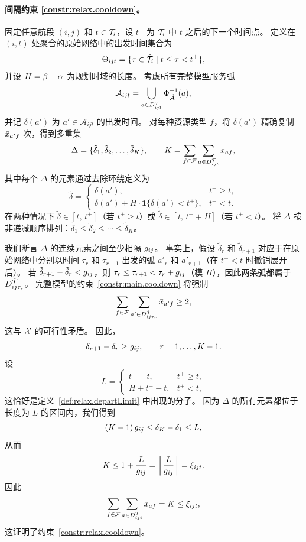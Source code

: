 \paragraph*{间隔约束 \eqref{constr:relax.cooldown}。}
固定任意航段 $(i,j)$ 和 $t\in\mathcal{T}_i$，设 $t^{+}$ 为 $\mathcal{T}_i$ 中 $t$ 之后的下一个时间点。
定义在 $(i,t)$ 处聚合的原始网络中的出发时间集合为
\[
    \Theta_{ijt}=\{\tau\in\hat{\mathcal{T}}_i\mid t\le\tau<t^{+}\},
\]
并设 $H=\beta-\alpha$ 为规划时域的长度。
考虑所有完整模型服务弧
\[
    \mathcal{A}_{ijt}=\bigcup_{a\in D_{ijt}^{\mathcal{T}}}\Phi_{\hat{\mathcal{A}}}^{-1}(a),
\]
并记 $\delta(a')$ 为 $a'\in\mathcal{A}_{ijt}$ 的出发时间。
对每种资源类型 $f$，将 $\delta(a')$ 精确复制 $\bar{x}_{a'f}$ 次，得到多重集
\[
    \Delta=\{\tilde{\delta}_1,\tilde{\delta}_2,\ldots,\tilde{\delta}_K\},
    \qquad K=\sum_{f\in\mathcal{F}}\sum_{a\in D_{ijt}^{\mathcal{T}}}x_{af},
\]
其中每个 $\Delta$ 的元素通过去除环绕定义为
\[
    \tilde{\delta}=
    \begin{cases}
        \delta(a'), & t^{+}\ge t,\\[2pt]
        \delta(a') + H\cdot\mathbf{1}\{\delta(a')<t^{+}\}, & t^{+}<t.
    \end{cases}
\]
在两种情况下 $\tilde{\delta}\in[t,\,t^{+}]$（若 $t^{+}\ge t$）或 $\tilde{\delta}\in[t,\,t^{+}+H]$（若 $t^{+}<t$）。
将 $\Delta$ 按非递减顺序排列：$\tilde{\delta}_1\le\tilde{\delta}_2\le\cdots\le\tilde{\delta}_K$。

我们断言 $\Delta$ 的连续元素之间至少相隔 $g_{ij}$。
事实上，假设 $\tilde{\delta}_r$ 和 $\tilde{\delta}_{r+1}$ 对应于在原始网络中分别以时间 $\tau_r$ 和 $\tau_{r+1}$ 出发的弧 $a'_r$ 和 $a'_{r+1}$（在 $t^{+}<t$ 时撤销展开后）。
若 $\tilde{\delta}_{r+1}-\tilde{\delta}_r<g_{ij}$，则 $\tau_{r}\le\tau_{r+1}<\tau_r+g_{ij}$（模 $H$），因此两条弧都属于 $D_{ij\tau_r}^{\hat{\mathcal{T}}}$。
完整模型的约束~\eqref{constr:main.cooldown} 将强制
\[
    \sum_{f\in\mathcal{F}}\sum_{a'\in D_{ij\tau_r}^{\hat{\mathcal{T}}}}\bar{x}_{a'f} \ge 2,
\]
这与 $\mathcal{X}$ 的可行性矛盾。
因此，
\[
    \tilde{\delta}_{r+1}-\tilde{\delta}_r \ge g_{ij},\qquad r=1,\ldots,K-1.
\]
设
\[
    L=
    \begin{cases}
        t^{+}-t, & t^{+}\ge t,\\[2pt]
        H+t^{+}-t, & t^{+}<t,
    \end{cases}
\]
这恰好是定义~\eqref{def:relax.departLimit} 中出现的分子。
因为 $\Delta$ 的所有元素都位于长度为 $L$ 的区间内，我们得到
\[
    (K-1)\,g_{ij} \le \tilde{\delta}_K-\tilde{\delta}_1 \le L,
\]
从而
\[
    K \le 1 + \frac{L}{g_{ij}}
      = \left\lceil \frac{L}{g_{ij}} \right\rceil
      = \xi_{ijt}.
\]
因此
\[
    \sum_{f\in\mathcal{F}}\sum_{a\in D_{ijt}^{\mathcal{T}}}x_{af}
    = K
    \le \xi_{ijt},
\]
这证明了约束~\eqref{constr:relax.cooldown}。